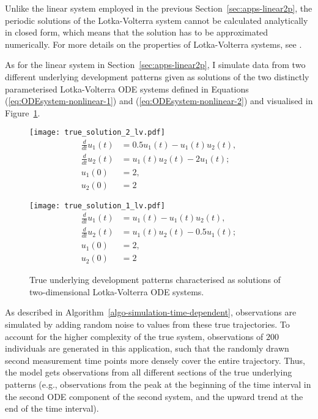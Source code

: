 Unlike the linear system employed in the previous Section~\ref{sec:apps-linear2p}, the periodic solutions of the Lotka-Volterra system cannot be calculated analytically in closed form, which means that the solution has to be approximated numerically. 
For more details on the properties of Lotka-Volterra systems, see \cite[pp.~209-215]{Teschl2012}. 

As for the linear system in Section~\ref{sec:apps-linear2p}, I simulate data from two different underlying development patterns given as solutions of the two distinctly parameterised Lotka-Volterra ODE systems defined in Equations (\ref{eq:ODEsystem-nonlinear-1}) and (\ref{eq:ODEsystem-nonlinear-2}) and visualised in Figure~\ref{fig:true_solution_lv}.

\begin{figure}
	\centering
	\begin{minipage}{.5\linewidth}
		\centering
		\texttt{[image: true\_solution\_2\_lv.pdf]}
		\begin{equation}\label{eq:ODEsystem-nonlinear-1}
		\begin{split}
				\frac{d}{dt}u_1(t) &= 0.5 u_1(t) - u_1(t) u_2(t), \\
				\frac{d}{dt}u_2(t) &= u_1(t) u_2(t) - 2 u_1(t); \\
				u_1(0) &= 2, \\ 
				u_2(0) &= 2
		\end{split}
		\end{equation}
	\end{minipage}\begin{minipage}{.5\linewidth}
		\centering
		\texttt{[image: true\_solution\_1\_lv.pdf]}
		\begin{equation}\label{eq:ODEsystem-nonlinear-2}
		\begin{split}
				\frac{d}{dt}u_1(t) &= u_1(t) - u_1(t) u_2(t), \\
				\frac{d}{dt}u_2(t) &= u_1(t) u_2(t) - 0.5 u_1(t); \\
				u_1(0) &= 2, \\ 
				u_2(0) &= 2 
		\end{split}
		\end{equation}
	\end{minipage}
	\caption{True underlying development patterns characterised as solutions of two-dimensional Lotka-Volterra ODE systems.}
	\label{fig:true_solution_lv}
\end{figure}

As described in Algorithm~\ref{algo-simulation-time-dependent}, observations are simulated by adding random noise to values from these true trajectories. 
To account for the higher complexity of the true system, observations of $200$ individuals are generated in this application, such that the randomly drawn second measurement time points more densely cover the entire trajectory. Thus, the model gets observations from all different sections of the true underlying patterns (e.g., observations from the peak at the beginning of the time interval in the second ODE component of the second system, and the upward trend at the end of the time interval). 

